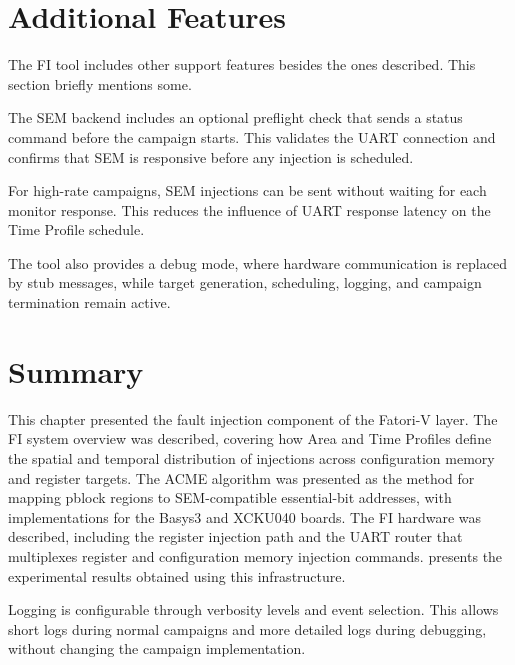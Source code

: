 \section{Additional Features}
\label{chap8:fi_integration}

The \ac{FI} tool includes other support features besides the ones described. This section briefly mentions some.

The \ac{SEM} backend includes an optional preflight check that sends a status command before the campaign starts. This validates the \ac{UART} connection and confirms that \ac{SEM} is responsive before any injection is scheduled.

For high-rate campaigns, \ac{SEM} injections can be sent without waiting for each monitor response. This reduces the influence of \ac{UART} response latency on the Time Profile schedule.

The tool also provides a debug mode, where hardware communication is replaced by stub messages, while target generation, scheduling, logging, and campaign termination remain active.



\section{Summary}
\label{chap8:summary}

This chapter presented the fault injection component of the \ac{Fatori-V} layer. The \ac{FI} system overview was described, covering how Area and Time Profiles define the spatial and temporal distribution of injections across configuration memory and register targets. The \ac{ACME} algorithm was presented as the method for mapping pblock regions to \ac{SEM}-compatible essential-bit addresses, with implementations for the Basys3 and XCKU040 boards. The \ac{FI} hardware was described, including the register injection path and the \ac{UART} router that multiplexes register and configuration memory injection commands.  presents the experimental results obtained using this infrastructure.

Logging is configurable through verbosity levels and event selection. This allows short logs during normal campaigns and more detailed logs during debugging, without changing the campaign implementation.